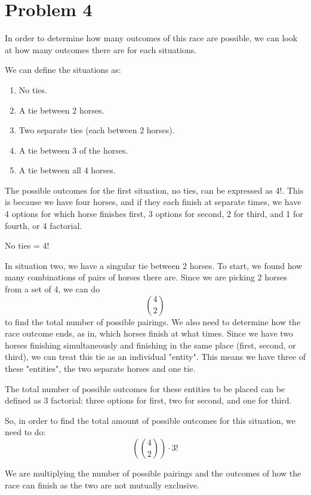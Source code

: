 \documentclass{article}
\begin{document}
\section*{Problem 4}

In order to determine how many outcomes of this race are possible, we can look at how many outcomes there are for each situations.

We can define the situations as:


\begin{enumerate}
    \item No ties.
    \item A tie between 2 horses.
    \item Two separate ties (each between 2 horses).
    \item A tie between 3 of the horses.
    \item A tie between all 4 horses.
\end{enumerate}

The possible outcomes for the first situation, no ties, can be expressed as 4!. This is because we have four horses, and if they each finish at separate times, we have 4 options for which horse finishes first, 3 options for second, 2 for third, and 1 for fourth, or 4 factorial.

\begin{center}
    No ties = $4!$
\end{center}

In situation two, we have a singular tie between 2 horses. To start, we found how many combinations of pairs of horses there are. Since we are picking 2 horses from a set of 4, we can do \[
    {4} \choose{2}
\] to find the total number of possible pairings. We also need to determine how the race outcome ends, as in, which horses finish at what times. Since we have two horses finishing simultaneously and finishing in the same place (first, second, or third), we can treat this tie as an individual "entity". This means we have three of these "entities", the two separate horses and one tie.

The total number of possible outcomes for these entities to be placed can be defined as 3 factorial: three options for first, two for second, and one for third.

So, in order to find the total amount of possible outcomes for this situation,  we need to do:
\[
    \left(4\choose2\right) \cdot 3!
\]


We are multiplying the number of possible pairings and the outcomes of how the race can finish as the two are not mutually exclusive.
\end{document}
